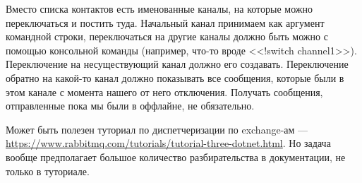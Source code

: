 \documentclass[a5paper]{article}
\begin{document}
Вместо списка контактов есть именованные каналы, на которые можно переключаться и постить туда. Начальный канал принимаем как аргумент командной строки, переключаться на другие каналы должно быть можно с помощью консольной команды (например, что-то вроде <<!switch channel1>>). Переключение на несуществующий канал должно его создавать. Переключение обратно на какой-то канал должно показывать все сообщения, которые были в этом канале с момента нашего от него отключения. Получать сообщения, отправленные пока мы были в оффлайне, не обязательно.

Может быть полезен туториал по диспетчеризации по exchange-ам --- \url{https://www.rabbitmq.com/tutorials/tutorial-three-dotnet.html}. Но задача вообще предполагает большое количество разбирательства в документации, не только в туториале.
\end{document}
